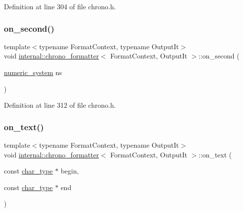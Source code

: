 Definition at line 304 of file chrono.\+h.

\mbox{\label{structinternal_1_1chrono__formatter_a569d41b43bfdf48aca8ff9429f57dea3}} 
\subsubsection{\texorpdfstring{on\+\_\+second()}{on\_second()}}
{\footnotesize\ttfamily template$<$typename Format\+Context, typename Output\+It$>$ \\
void \hyperlink{structinternal_1_1chrono__formatter}{internal\+::chrono\+\_\+formatter}$<$ Format\+Context, Output\+It $>$\+::on\+\_\+second (\begin{DoxyParamCaption}\item[{\hyperlink{namespaceinternal_a16e2a1195ca0f5beab658685f71df86b}{numeric\+\_\+system}}]{ns }\end{DoxyParamCaption})\hspace{0.3cm}{\ttfamily [inline]}}



Definition at line 312 of file chrono.\+h.

\mbox{\label{structinternal_1_1chrono__formatter_aaae159c7a01320f53cf0ce746fc855ea}} 
\subsubsection{\texorpdfstring{on\+\_\+text()}{on\_text()}}
{\footnotesize\ttfamily template$<$typename Format\+Context, typename Output\+It$>$ \\
void \hyperlink{structinternal_1_1chrono__formatter}{internal\+::chrono\+\_\+formatter}$<$ Format\+Context, Output\+It $>$\+::on\+\_\+text (\begin{DoxyParamCaption}\item[{const \hyperlink{structinternal_1_1chrono__formatter_a48a141d8bc5a48a0c24e19780ba65512}{char\+\_\+type} $\ast$}]{begin,  }\item[{const \hyperlink{structinternal_1_1chrono__formatter_a48a141d8bc5a48a0c24e19780ba65512}{char\+\_\+type} $\ast$}]{end }\end{DoxyParamCaption})\hspace{0.3cm}{\ttfamily [inline]}}



